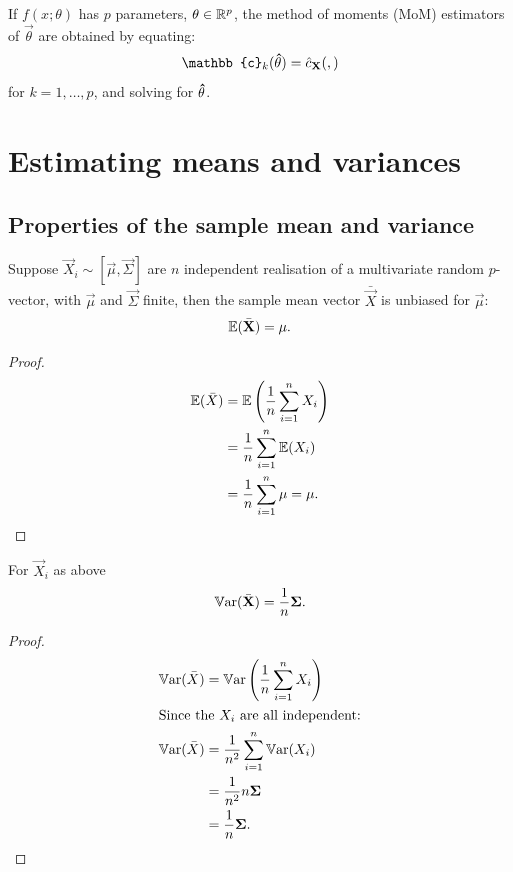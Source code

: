 \documentclass[10pt, a4paper]{article}
\begin{document}
\begin{definition}
    If $f(x; \theta)$ has $p$ parameters,
    $\mathbf{\theta} \in \mathbb{R} ^ p$,
    the method of moments
    (MoM)
    estimators of $\vec{\theta}$ are obtained by equating:
    \[
    \mathbb{c}_k(\hvec{\theta}) = \hat{c}_{\vec{X}}(,)
    \]
    for $k = 1, \dotsc, p$,
    and solving for $\mathbf{\hat{\theta}}$.
\end{definition}

\newpage

\section{Estimating means and variances}

\subsection{Properties of the sample mean and variance}

\begin{proposition}
    Suppose $\vec{X}_i \sim [\vec{\mu}, \vec{\Sigma}]$ are $n$ independent realisation of a multivariate random $p$-vector,
    with $\vec{\mu}$ and $\vec{\Sigma}$ finite,
    then the sample mean vector $\bar{\vec{X}}$ is unbiased for $\vec{\mu}$:
    \[
    \mathbb{E}(\bar{\mathbf{X}}) = \mathbf{\mu}.
    \]

    \begin{proof}
        \begin{align*}
            \mathbb{E}(\bar{X}) &= \mathbb{E}\left(\frac{1}{n}\sum_{i = 1}^{n}X_i\right) \\
            &= \frac{1}{n}\sum_{i = 1}^{n}\mathbb{E}(X_i) \\
            &= \frac{1}{n}\sum_{i = 1}^{n}\mu = \mu.
        \end{align*}
    \end{proof}
\end{proposition}

\begin{proposition}
    For $\vec{X}_i$ as above
    \[
    \mathbb{V}\mathrm{ar}(\bar{\mathbf{X}}) = \frac{1}{n}\mathbf{\Sigma}.
    \]

    \begin{proof}
        \begin{align*}
            \mathbb{V}\mathrm{ar}(\bar{X}) &= \mathbb{V}\mathrm{ar}\left(\frac{1}{n}\sum_{i = 1}^{n}X_i\right) \\
            \intertext{Since the $X_i$ are all independent:}
            \mathbb{V}\mathrm{ar}(\bar{X}) &= \frac{1}{n ^ 2}\sum_{i = 1}^{n}\mathbb{V}\mathrm{ar}(X_i) \\
            &= \frac{1}{n ^ 2}n\mathbf{\Sigma} \\
            &= \frac{1}{n}\mathbf{\Sigma}.
        \end{align*}
    \end{proof}
\end{proposition}
\end{document}
